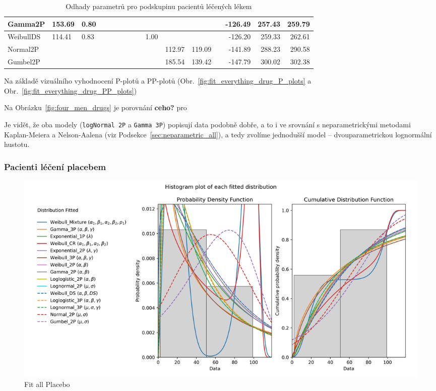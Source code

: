 \documentclass[a4, 11pt]{article}
\newcommand{\commm}[1]{{\textcolor[cmyk]{0,1,0,0}{\textbf{\textsf{#1}}}}}      %
\theoremstyle{definition}
\theoremstyle{remark}
\begin{document}
\begin{table}[H]
\begin{tabular}{@{}|l|l|l|l|l|l|l|l|l|l|l|l|l|r|r|r|@{}}
		Gamma2P       & 153.69 & 0.80 &      &        &      &        &        &      &      &        &        &      & -126.49 & 257.43 & 259.79 \\ \midrule
		WeibullDS     & 114.41 & 0.83 &      &        &      &        &        &      & 1.00 &        &        &      & -126.20 & 259.33 & 262.61 \\ \midrule
		Normal2P      &        &      &      &        &      &        &        &      &      & 112.97 & 119.09 &      & -141.89 & 288.23 & 290.58 \\ \midrule
		Gumbel2P      &        &      &      &        &      &        &        &      &      & 185.54 & 139.42 &      & -147.79 & 300.02 & 302.38 \\ \bottomrule
	\end{tabular}
	\caption{Odhady parametrů pro podskupinu pacientů léčených lékem}
	\label{tab:fitall_output_parameters_tab}
	\normalsize
\end{table}

	Na základě vizuálního vyhodnocení P-plotů a PP-plotů (Obr.~\ref{fig:fit_everything_drug_P_plots} a Obr.~\ref{fig:fit_everything_drug_PP_plots})

	Na Obrázku~\ref{fig:four_men_drugs} je porovnání \commm{ceho?} pro
	
	Je vidět, že oba modely (\texttt{logNormal 2P} a \texttt{Gamma 3P}) popisují data podobně dobře, a to i ve srovnání s neparametrickými metodami Kaplan-Meiera a Nelson-Aalena (viz Podsekce~\ref{sec:neparametric_all}), a tedy zvolíme jednodušší model -- dvouparametrickou lognormální hustotu.
	
	
	
	\subsubsection{Pacienti léčení placebem} \label{sec:parametric_placebo}
	
	\begin{figure}[H]
		\centering
		\includegraphics[width=0.8\linewidth]{img/fiteverything_placebo_histogram.png}
		\caption{Fit all Placebo}
		\label{fig:fit_everything_hist_placebo}
	\end{figure}
\end{document}
